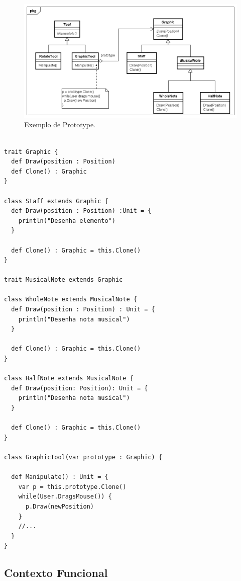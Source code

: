 \begin{figure}[htb]
	\caption{\label{prototype_exemplo}Exemplo de Prototype.}
	\begin{center}
	    \includegraphics[scale=0.5]{5_padroes-contexto-funcional/5.1_criacionais/5.1.4_prototype/prototype_exemplo.png}
	\end{center}
\end{figure}

\begin{lstlisting}[caption={Prototype Orientado a Objetos.},label=ooprototype]

trait Graphic {
  def Draw(position : Position)
  def Clone() : Graphic
}

class Staff extends Graphic {
  def Draw(position : Position) :Unit = {
    println("Desenha elemento")
  }

  def Clone() : Graphic = this.Clone()
}

trait MusicalNote extends Graphic

class WholeNote extends MusicalNote {
  def Draw(position : Position) : Unit = {
    println("Desenha nota musical")
  }

  def Clone() : Graphic = this.Clone()
}

class HalfNote extends MusicalNote {
  def Draw(position: Position): Unit = {
    println("Desenha nota musical")
  }

  def Clone() : Graphic = this.Clone()
}

class GraphicTool(var prototype : Graphic) {

  def Manipulate() : Unit = {
    var p = this.prototype.Clone()
    while(User.DragsMouse()) {
      p.Draw(newPosition)
    }
    //...
  }
}

\end{lstlisting}

\subsection*{Contexto Funcional}

